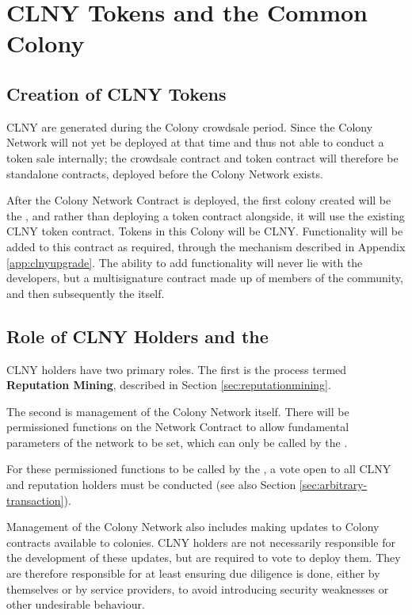 \section{CLNY Tokens and the Common Colony}\label{sec:clny}

\subsection{Creation of CLNY Tokens}
CLNY are generated during the Colony crowdsale period. Since the Colony Network will not yet be deployed at that time and thus not able to conduct a token sale internally; the crowdsale contract and token contract will therefore be standalone contracts, deployed before the Colony Network exists.
 
After the Colony Network Contract is deployed, the first colony created will be the \rc, and rather than deploying a token contract alongside, it will use the existing CLNY token contract. Tokens in this Colony will be CLNY. Functionality will be added to this contract as required, through the mechanism described in Appendix \ref{app:clnyupgrade}. The ability to add functionality will never lie with the developers, but a multisignature contract made up of members of the community, and then subsequently the \rc itself.

\subsection{Role of CLNY Holders and the \rc}
CLNY holders have two primary roles. The first is the process termed \textbf{Reputation Mining}, described in Section \ref{sec:reputationmining}.

The second is management of the Colony Network itself. There will be permissioned functions on the Network Contract to allow fundamental parameters of the network to be set, which can only be called by the \rc.

For these permissioned functions to be called by the \rc, a vote open to all CLNY and reputation holders must be conducted  (see also Section \ref{sec:arbitrary-transaction}).

Management of the Colony Network also includes making updates to Colony contracts available to colonies. CLNY holders are not necessarily responsible for the development of these updates, but are required to vote to deploy them. They are therefore responsible for at least ensuring due diligence is done, either by themselves or by service providers, to avoid introducing security weaknesses or other undesirable behaviour.

